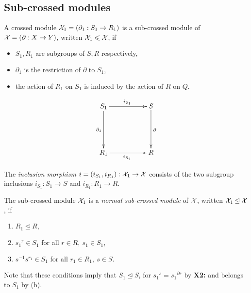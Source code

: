 \subsection{Sub-crossed modules} \label{subs:subxmods}

\begin{defn} 
A crossed module $\mathcal{X}_1 = (\partial_1 : S_1 \to R_1)$
is a sub-crossed module of $\mathcal{X} = (\partial : X \to Y)$,
written $\mathcal{X}_1 \leqslant \mathcal{X}$, if
\begin{itemize}
\item $S_1,R_1$ are subgroups of $S,R$ respectively,
\item $\partial_1$ is the restriction of $\partial$ to $S_1$,
\item the action of $R_1$ on $S_1$ is induced by the action of $R$ on $Q$.
\end{itemize}
\end{defn}

$$
\xymatrix{ 
  S_1 \ar[rr]^{i_{S_1}} \ar[dd]_{\partial_1}
     && S \ar[dd]^{\partial} \\
     &&  \\
  R_1 \ar[rr]_{i_{R_1}}
     && R
}
$$

\begin{defn}  
The \emph{inclusion morphism} 
$i = (i_{S_1},i_{R_1}) : \mathcal{X}_1 \to \mathcal{X}$
consists of the two subgroup inclusions
$i_{S_1} : S_1 \to S$ and $i_{R_1} : R_1 \to R$.
\end{defn}

\begin{defn}  
The sub-crossed module $\mathcal{X}_1$ is a 
\emph{normal sub-crossed module} of $\mathcal{X}$, 
written $\mathcal{X}_1 \unlhd \mathcal{X}$, if
\begin{enumerate}[{\rm (a)}]
\item $R_1 \unlhd R$,
\item ${s_1}^r \in S_1$ for all $r \in R,~ s_1 \in S_1$,
\item $s^{-1}s^{r_1} \in S_1$ for all $r_1 \in R_1,~ s \in S$.
\end{enumerate}
\end{defn}

\noindent
Note that these conditions imply that $S_1 \unlhd S$, 
for ${s_1}^s = {s_1}^{\partial s}$ by {\bf X2:} 
and belongs to $S_1$ by (b).


